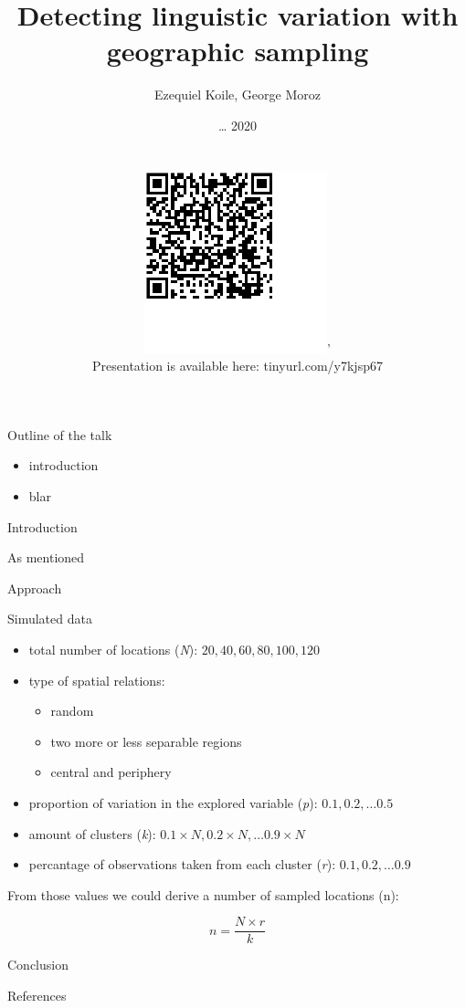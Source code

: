 \documentclass[
  ignorenonframetext,
]{beamer}
\title{Detecting linguistic variation with geographic sampling}
\author{Ezequiel Koile, George Moroz}
\date{\ldots{} 2020\\
~\\
~\\
\includegraphics{images/00_qrcode.png}'\\
Presentation is available here: \alert{tinyurl.com/y7kjsp67}}
\institute{Linguistic Convergence Laboratory, NRU HSE}
\newif\ifbibliography
\providecommand{\tightlist}{%
  \setlength{\itemsep}{0pt}\setlength{\parskip}{0pt}}
\begin{document}
\frame{\titlepage}

\begin{frame}{Outline of the talk}
\protect\hypertarget{outline-of-the-talk}{}

\begin{itemize}
\tightlist
\item
  introduction
\item
  blar
\end{itemize}

\end{frame}

\begin{frame}{Introduction}
\protect\hypertarget{introduction}{}

As \citet{dorian10} mentioned

\end{frame}

\begin{frame}{Approach}
\protect\hypertarget{approach}{}

\end{frame}

\begin{frame}{Simulated data}
\protect\hypertarget{simulated-data}{}

\begin{itemize}
\tightlist
\item
  total number of locations (\emph{N}): \(20, 40, 60, 80, 100, 120\)
\item
  type of spatial relations:

  \begin{itemize}
  \tightlist
  \item
    random
  \item
    two more or less separable regions
  \item
    central and periphery
  \end{itemize}
\item
  proportion of variation in the explored variable (\emph{p}):
  \(0.1, 0.2, \dots 0.5\)
\item
  amount of clusters (\emph{k}):
  \(0.1\times N, 0.2\times N, \dots 0.9\times N\)
\item
  percantage of observations taken from each cluster (\emph{r}):
  \(0.1, 0.2, \dots 0.9\)
\end{itemize}

From those values we could derive a number of sampled locations (n):

\[n = \frac{N\times r}{k}\]

\end{frame}

\begin{frame}{Conclusion}
\protect\hypertarget{conclusion}{}

\end{frame}

\renewcommand\refname{References}
\begin{frame}[allowframebreaks]{References}
  \bibliographytrue
  
\end{frame}
\end{document}
